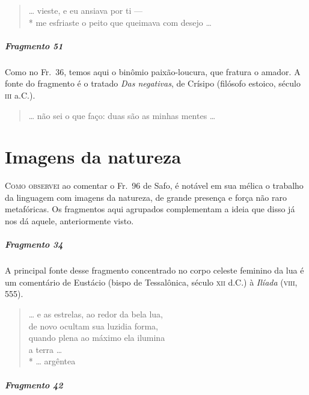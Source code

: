 \begin{verse}
\ldots{} vieste, e eu ansiava por ti --- \\*
me esfriaste o peito que queimava com \qb{}desejo \ldots{}
\end{verse}

\paragraph{Fragmento 51}

{\small Como no Fr.~36, temos aqui o binômio paixão-loucura, que fratura o amador. A
fonte do fragmento é o tratado \textit{Das negativas}, de Crísipo (filósofo
estoico, século \textsc{iii} a.C.).}   \EP[]

\begin{verse}
\ldots{} não sei o que faço: duas são as minhas \qb{}mentes \ldots{}
\end{verse}

\chapter{Imagens da natureza}

\textsc{Como observei} ao comentar o Fr.~96 de Safo, é notável em sua mélica o trabalho
da linguagem com imagens da natureza, de grande presença e força não raro
metafóricas. Os fragmentos aqui agrupados complementam a ideia que disso já nos
dá aquele, anteriormente visto.

\paragraph{Fragmento 34}

{\small A principal fonte desse fragmento concentrado no corpo celeste feminino da lua é
um comentário de Eustácio (bispo de Tessalônica, século \textsc{xii} d.C.) à
\textit{Ilíada }(\textsc{viii}, 555).}

\begin{verse}
\ldots{} e as estrelas, ao redor da bela lua,\\
de novo ocultam sua luzidia forma,\\
quando plena ao máximo ela ilumina\\
a terra \ldots{} \\*
\ldots{} argêntea
\end{verse}

\paragraph{Fragmento 42}

